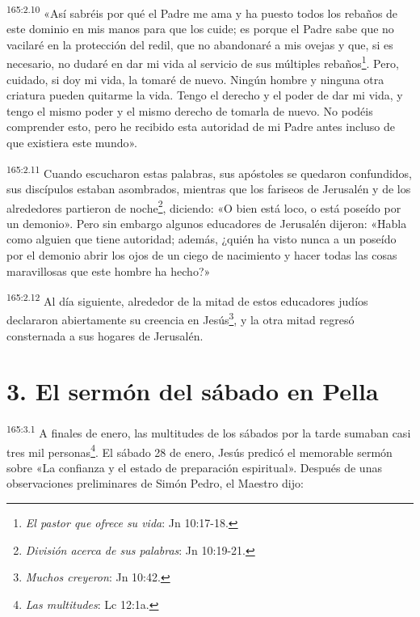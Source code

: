 \par
\textsuperscript{165:2.10} «Así sabréis por qué el Padre me ama y ha puesto todos los rebaños de este dominio en mis manos para que los cuide; es porque el Padre sabe que no vacilaré en la protección del redil, que no abandonaré a mis ovejas y que, si es necesario, no dudaré en dar mi vida al servicio de sus múltiples rebaños\footnote{\textit{El pastor que ofrece su vida}: Jn 10:17-18.}. Pero, cuidado, si doy mi vida, la tomaré de nuevo. Ningún hombre y ninguna otra criatura pueden quitarme la vida. Tengo el derecho y el poder de dar mi vida, y tengo el mismo poder y el mismo derecho de tomarla de nuevo. No podéis comprender esto, pero he recibido esta autoridad de mi Padre antes incluso de que existiera este mundo».

\par
\textsuperscript{165:2.11} Cuando escucharon estas palabras, sus apóstoles se quedaron confundidos, sus discípulos estaban asombrados, mientras que los fariseos de Jerusalén y de los alrededores partieron de noche\footnote{\textit{División acerca de sus palabras}: Jn 10:19-21.}, diciendo: «O bien está loco, o está poseído por un demonio». Pero sin embargo algunos educadores de Jerusalén dijeron: «Habla como alguien que tiene autoridad; además, ¿quién ha visto nunca a un poseído por el demonio abrir los ojos de un ciego de nacimiento y hacer todas las cosas maravillosas que este hombre ha hecho?»

\par
\textsuperscript{165:2.12} Al día siguiente, alrededor de la mitad de estos educadores judíos declararon abiertamente su creencia en Jesús\footnote{\textit{Muchos creyeron}: Jn 10:42.}, y la otra mitad regresó consternada a sus hogares de Jerusalén.

\section*{3. El sermón del sábado en Pella}
\par
\textsuperscript{165:3.1} A finales de enero, las multitudes de los sábados por la tarde sumaban casi tres mil personas\footnote{\textit{Las multitudes}: Lc 12:1a.}. El sábado 28 de enero, Jesús predicó el memorable sermón sobre «La confianza y el estado de preparación espiritual». Después de unas observaciones preliminares de Simón Pedro, el Maestro dijo:

